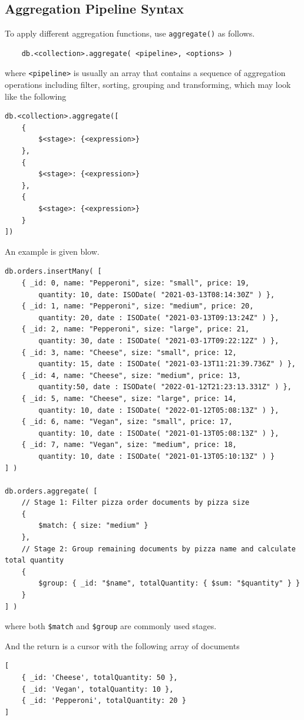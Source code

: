 \subsection{Aggregation Pipeline Syntax}

To apply different aggregation functions, use \verb|aggregate()| as follows.
\begin{lstlisting}
	db.<collection>.aggregate( <pipeline>, <options> )
\end{lstlisting}
where \verb|<pipeline>| is usually an array that contains a sequence of aggregation operations including filter, sorting, grouping and transforming, which may look like the following
\begin{lstlisting}
db.<collection>.aggregate([
	{
		$<stage>: {<expression>}
	},
	{
		$<stage>: {<expression>}
	},
	{
		$<stage>: {<expression>}
	}
])
\end{lstlisting}

An example is given blow.
\begin{lstlisting}
db.orders.insertMany( [
	{ _id: 0, name: "Pepperoni", size: "small", price: 19,
		quantity: 10, date: ISODate( "2021-03-13T08:14:30Z" ) },
	{ _id: 1, name: "Pepperoni", size: "medium", price: 20,
		quantity: 20, date : ISODate( "2021-03-13T09:13:24Z" ) },
	{ _id: 2, name: "Pepperoni", size: "large", price: 21,
		quantity: 30, date : ISODate( "2021-03-17T09:22:12Z" ) },
	{ _id: 3, name: "Cheese", size: "small", price: 12,
		quantity: 15, date : ISODate( "2021-03-13T11:21:39.736Z" ) },
	{ _id: 4, name: "Cheese", size: "medium", price: 13,
		quantity:50, date : ISODate( "2022-01-12T21:23:13.331Z" ) },
	{ _id: 5, name: "Cheese", size: "large", price: 14,
		quantity: 10, date : ISODate( "2022-01-12T05:08:13Z" ) },
	{ _id: 6, name: "Vegan", size: "small", price: 17,
		quantity: 10, date : ISODate( "2021-01-13T05:08:13Z" ) },
	{ _id: 7, name: "Vegan", size: "medium", price: 18,
		quantity: 10, date : ISODate( "2021-01-13T05:10:13Z" ) }
] )
	
db.orders.aggregate( [
	// Stage 1: Filter pizza order documents by pizza size
	{
		$match: { size: "medium" }
	},
	// Stage 2: Group remaining documents by pizza name and calculate total quantity
	{
		$group: { _id: "$name", totalQuantity: { $sum: "$quantity" } }
	}
] )
\end{lstlisting}
where both \verb|$match| and \verb|$group| are commonly used stages.

And the return is a cursor with the following array of documents
\begin{lstlisting}
[
	{ _id: 'Cheese', totalQuantity: 50 },
	{ _id: 'Vegan', totalQuantity: 10 },
	{ _id: 'Pepperoni', totalQuantity: 20 }
]
\end{lstlisting}

